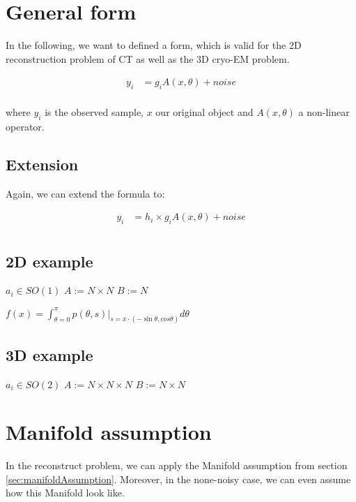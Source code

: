 \section{General form}

In the following, we want to defined a form, which is valid for the 2D reconstruction 
problem of CT as well as the 3D cryo-EM problem.


\begin{equation}
    \begin{aligned}
        y_i &= g_i  A(x, \theta) + noise \\
    \end{aligned}
\end{equation}

where $y_i$ is the observed sample, $x$ our original object and $A(x, \theta)$ a non-linear operator.



\subsection{Extension}
Again, we can extend the formula to:

\begin{equation}
    \begin{aligned}
        y_i &= h_i \times g_i  A(x, \theta) + noise \\
    \end{aligned}
\end{equation}

\subsection{2D example}

$a_i \in SO(1)$
$A := N \times N$
$B := N$

$f(x) = \int_{\theta = 0}^{\pi} p(\theta, s) |_{s=x \cdot (- \sin \theta, cos \theta) } d \theta$



\subsection{3D example}

$a_i \in SO(2)$
$A := N \times N \times N$
$B := N \times N$





\section{Manifold assumption}
In the reconstruct problem, we can apply the Manifold assumption from section \ref{sec:manifoldAssumption}.
Moreover, in the none-noisy case, we can even assume how this Manifold look like.


